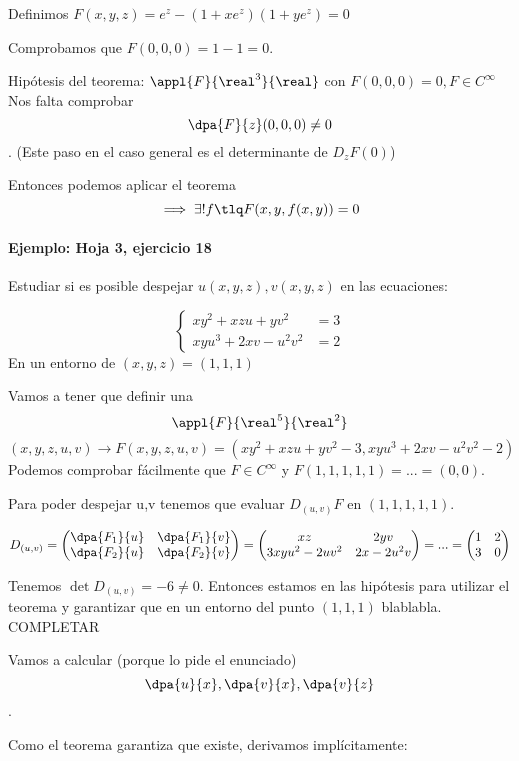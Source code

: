 Definimos $F(x,y,z) = e^z - (1+xe^z)(1+ye^z) = 0$

Comprobamos que $F(0,0,0) = 1-1 = 0$.

Hipótesis del teorema: $\appl{F}{\real^3}{\real}$ con $F(0,0,0) = 0, F \in C^{\infty}$
Nos falta comprobar \[\dpa{F}{z}(0,0,0) \neq 0\]. (Este paso en el caso general es el determinante de $D_zF(0)$)

Entonces podemos aplicar el teorema 
\[\implies \exists ! f \tlq F(x,y,f(x,y)) = 0\]

\paragraph{Ejemplo: Hoja 3, ejercicio 18}

Estudiar si es posible despejar $u(x,y,z), v(x,y,z)$ en las ecuaciones:

\[\left\{\begin{matrix} xy^2+xzu+yv^2 &= 3\\ xyu^3+2xv-u^2v^2 &= 2\end{matrix}\right.\]
En un entorno de $(x,y,z) = (1,1,1)$

Vamos a tener que definir una 
\[\appl{F}{\real^5}{\real^2}\]
\[(x,y,z,u,v) \rightarrow F(x,y,z,u,v)= (xy^2+xzu+yv^2-3,xyu^3+2xv-u^2v^2-2)\]
Podemos comprobar fácilmente que $F\in C^{\infty}$ y $F(1,1,1,1,1) = ... = (0,0)$.

Para poder despejar u,v tenemos que evaluar $D_{(u,v)}F$ en $(1,1,1,1,1)$.

\[D_{(u,v)} = \begin{pmatrix} \dpa{F_1}{u}&\dpa{F_1}{v}\\ \dpa{F_2}{u} &\dpa{F_2}{v}\end{pmatrix} 
= \begin{pmatrix} xz & 2yv\\3xyu^2-2uv^2 & 2x-2u^2v \end{pmatrix} = ... = \begin{pmatrix} 1&2\\ 3&0 \end{pmatrix}\]

Tenemos $\det D_{(u,v)} = -6 \neq 0$. Entonces estamos en las hipótesis para utilizar el teorema y garantizar que en un entorno del punto $(1,1,1)$ blablabla.
COMPLETAR

Vamos a calcular (porque lo pide el enunciado) \[\dpa{u}{x},\dpa{v}{x},\dpa{v}{z}\].

Como el teorema garantiza que existe, derivamos implícitamente:


